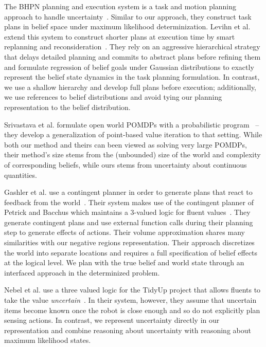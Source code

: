 The BHPN planning and execution system is a task and motion planning
approach to handle uncertainty~\cite{kaelbling2013integrated}. Similar
to our approach, they construct task plans in belief space under
maximum likelihood determinization. Levihn et al. extend this system to
construct shorter plans at execution time by smart replanning and
reconsideration~\cite{levihn2013foresight}. They rely on an aggressive
hierarchical strategy that delays detailed planning and commits to
abstract plans before refining them and formulate regression of belief
goals under Gaussian distributions to exactly represent the belief
state dynamics in the task planning formulation. In contrast, we use a
shallow hierarchy and develop full plans before execution; additionally, we use
references to belief distributions and avoid tying our planning
representation to the belief distribution.

Srivastava et al. formulate open world POMDPs with a probabilistic
program~\cite{srivastava2014first} -- they develop a generalization of
point-based value iteration to that setting. While both our method and
theirs can been viewed as solving very large POMDPs, their method's size stems from
the (unbounded) size of the world and complexity of corresponding
beliefs, while ours stems from uncertainty about continuous quantities.

Gashler et al. use a contingent planner in order to generate plans
that react to feedback from the world~\cite{gaschler2013kvp}. Their
system makes use of the contingent planner of Petrick and Bacchus
which maintains a 3-valued logic for fluent
values~\cite{petrick2002knowledge}. They generate contingent plans and
use external function calls during their planning step to generate
effects of actions. Their volume approximation shares many
similarities with our negative regions representation. Their
approach discretizes the world into separate locations and requires a
full specification of belief effects at the logical level. We plan with
the true belief and world state through an interfaced approach
in the determinized problem.

Nebel et al. use a three valued logic for the TidyUp project that
allows fluents to take the value
\emph{uncertain}~\cite{nebel13aaaiirs}. In their system, however, they
assume that uncertain items become known once the robot is close
enough and so do not explicitly plan sensing actions. In contrast, we
represent uncertainty directly in our representation and combine
reasoning about uncertainty with reasoning about maximum likelihood
states.

